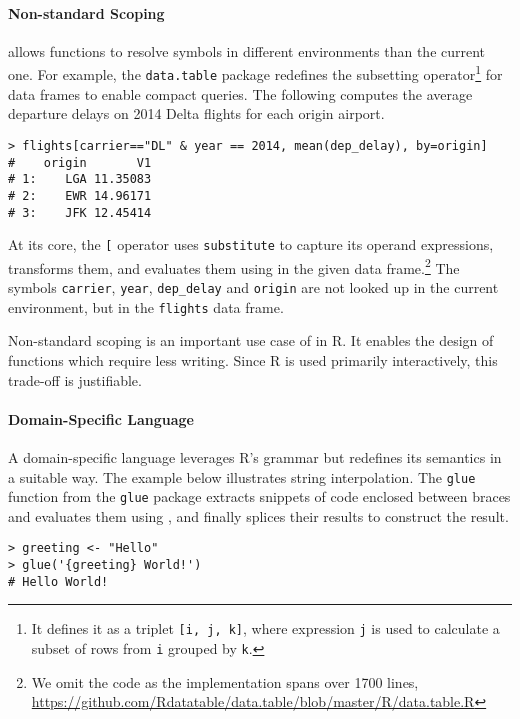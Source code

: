 \documentclass[review,screen,acmsmall]{acmart}%
\renewcommand{\k}[1]{\lstinline |#1|\xspace}
\begin{document}
\paragraph{Non-standard Scoping}

\Eval allows functions to resolve symbols in different environments than the
current one. For example, the \k{data.table} package redefines the subsetting
operator\footnote{It defines it as a triplet \texttt{[i, j, k]}, where expression
  \texttt{j} is used to calculate a subset of rows from \texttt{i} grouped by \texttt{k}.}
for data frames to enable compact queries. The following  
computes the average departure delays on 2014 Delta flights for each
origin airport.

\begin{minipage}{.95\textwidth}
\medskip
\begin{lstlisting}
> flights[carrier=="DL" & year == 2014, mean(dep_delay), by=origin]
#    origin       V1
# 1:    LGA 11.35083
# 2:    EWR 14.96171
# 3:    JFK 12.45414
\end{lstlisting}\medskip
\end{minipage}

At its core, the \k{[} operator uses \k{substitute} to capture its operand
expressions, transforms them, and evaluates them using \eval in the given data
frame.\footnote{We omit the code as the implementation spans over 1700 lines,\\
  \indent \cf
\url{https://github.com/Rdatatable/data.table/blob/master/R/data.table.R}} The
symbols \k{carrier}, \k{year}, \k{dep_delay} and \k{origin} are not looked up
in the current environment, but in the \k{flights} data frame. 

Non-standard scoping is an important use case of \eval in R. It enables the
design of functions which require less writing. Since R is used primarily
interactively, this trade-off is justifiable.

\paragraph{Domain-Specific Language}
A domain-specific language leverages R's grammar but redefines its semantics in
a suitable way. The example below illustrates string interpolation. The
\k{glue} function from the \k{glue} package extracts snippets of code enclosed
between braces and evaluates them using \eval, and finally splices their
results to construct the result.

\begin{minipage}{.95\textwidth}
\medskip
\begin{lstlisting}
> greeting <- "Hello"
> glue('{greeting} World!') 
# Hello World!
\end{lstlisting}\medskip
\end{minipage}
\end{document}
